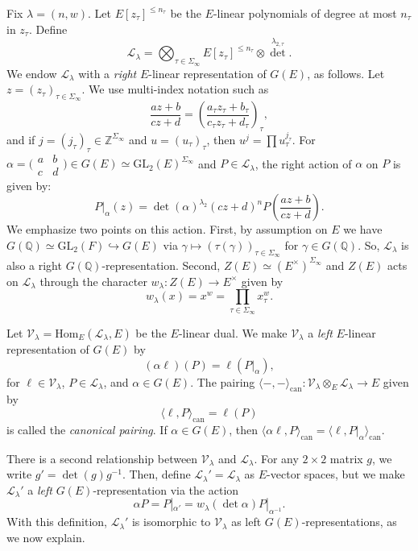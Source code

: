 \documentclass[10pt, twoside]{amsart}
\theoremstyle{plain}
\theoremstyle{definition}
\theoremstyle{remark}
\numberwithin{equation}{subsection}
\def\Q{\mathbb Q}
\def\Z{\mathbb Z}
\def\GL{\mathrm{GL}}
\def\Hom{\mathrm{Hom}}
\def\can{\mathrm{can}}
\def\can{\mathrm{can}}
\def\scrl{\mathscr L}
\def\scrv{\mathscr V}
\newcommand{\smallmat}[4]{\bigl(\begin{smallmatrix}#1&#2\\#3&#4\end{smallmatrix}\bigr)}
\begin{document}
Fix $\lambda = (n,w)$. Let $E[z_\tau]^{\leq n_\tau}$ be the $E$-linear polynomials of degree at most $n_\tau$ in  $z_\tau$. Define
$$
\scrl_\lambda = \bigotimes_{\tau \in \Sigma_\infty} E[z_{\tau}]^{\leq n_\tau} \otimes {\det}^{\lambda_{2,\tau}}.
$$
We endow $\scrl_\lambda$ with a {\em right} $E$-linear representation of $G(E)$, as follows. Let $z = (z_\tau)_{\tau \in \Sigma_\infty}$. We use multi-index notation such as 
$$
\frac{az+b}{cz+d} = \left(\frac{a_\tau z_\tau + b_\tau}{c_\tau z_\tau + d_\tau}\right)_{\tau},
$$
and if $j = (j_\tau)_{\tau} \in \Z^{\Sigma_\infty}$ and $u=(u_\tau)_{\tau}$, then $u^{j}= \prod u_\tau^{j_\tau}$. For $\alpha = \smallmat abcd \in G(E)\simeq \GL_2(E)^{\Sigma_\infty}$ and $P \in \scrl_\lambda$, the right action of $\alpha$ on $P$ is given by:
\begin{equation} \label{action1} 
P|_{\alpha} (z) = \det (\alpha)^{\lambda_2} (cz+d)^{n} P \left( \frac{az+b}{cz+d} \right).
\end{equation}
We emphasize two points on this action. First, by assumption on $E$ we have $G(\Q)\simeq \GL_2(F) \hookrightarrow G(E)$ via $\gamma \mapsto (\tau(\gamma))_{\tau \in \Sigma_\infty}$ for $\gamma \in G(\Q)$. So, $\scrl_\lambda$ is also a right $G(\Q)$-representation. Second, $Z(E) \simeq (E^\times)^{\Sigma_\infty}$ and $Z(E)$ acts on $\scrl_\lambda$ through the character $w_\lambda: Z(E) \rightarrow E^\times$ given by
\begin{equation*}
w_\lambda(x) = x^w = \prod_{\tau \in \Sigma_\infty} x_\tau^w.
\end{equation*}

Let $\scrv_\lambda = \Hom_E(\scrl_\lambda,E)$ be the $E$-linear dual. We make $\scrv_\lambda$ a {\em left} $E$-linear representation of $G(E)$ by
$$
(\alpha \ell) (P) =  \ell (P|_\alpha),
$$
for $\ell \in \scrv_\lambda$, $P \in \scrl_\lambda$, and $\alpha \in G(E)$.  The pairing $\langle - , - \rangle_{\can} : \scrv_\lambda \otimes_E \scrl_\lambda \rightarrow E$ given by
$$
\langle \ell , P \rangle_{\can} = \ell(P)
$$
is called the \emph{canonical pairing}. If $\alpha \in G(E)$, then $\langle \alpha \ell, P \rangle_{\can} = \langle \ell, P|_{\alpha} \rangle_{\can}$. 

There is a second relationship between $\scrv_\lambda$ and $\scrl_\lambda$. For any $2 \times 2$ matrix $g$, we write $g' = \det(g)g^{-1}$. Then, define $\scrl_\lambda' = \scrl_\lambda$ as $E$-vector spaces, but we make $\scrl_\lambda'$ a {\em left} $G(E)$-representation via the action
$$
\alpha P = P|_{\alpha'} = w_{\lambda}(\det \alpha)P|_{\alpha^{-1}}.
$$
With this definition, $\scrl_\lambda'$ is isomorphic to $\scrv_\lambda$ as left $G(E)$-representations, as we now explain. 
\end{document}
